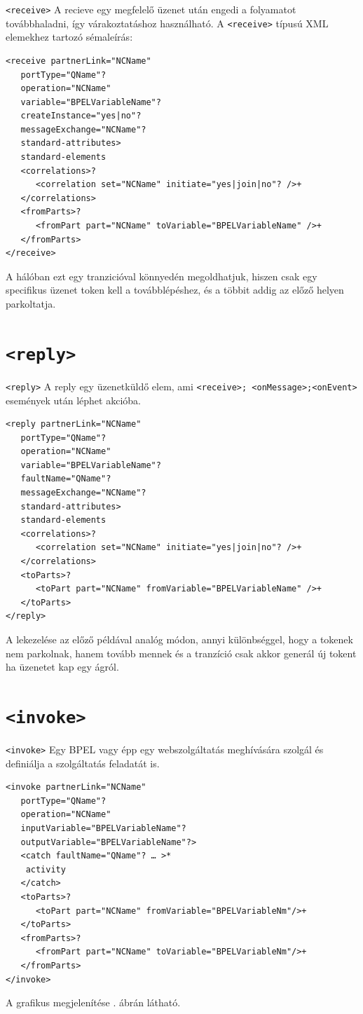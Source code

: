 \texttt{<receive>} A recieve egy megfelelő üzenet után engedi a folyamatot továbbhaladni, így várakoztatáshoz használható. A \texttt{<receive>} típusú XML elemekhez tartozó sémaleírás:\\
\begin{verbatim}
<receive partnerLink="NCName"
   portType="QName"?
   operation="NCName"
   variable="BPELVariableName"?
   createInstance="yes|no"?
   messageExchange="NCName"?
   standard-attributes>
   standard-elements
   <correlations>?
      <correlation set="NCName" initiate="yes|join|no"? />+
   </correlations>
   <fromParts>?
      <fromPart part="NCName" toVariable="BPELVariableName" />+
   </fromParts>
</receive>
\end{verbatim}
A hálóban ezt egy tranzicióval könnyedén megoldhatjuk, hiszen csak egy specifikus üzenet token kell a továbblépéshez, és a többit addig az előző helyen parkoltatja. 

\section{\texttt{<reply>}}

\texttt{<reply>} A reply egy üzenetküldő elem, ami \texttt{<receive>; <onMessage>;<onEvent>} események után léphet akcióba. 
\begin{verbatim}
<reply partnerLink="NCName"
   portType="QName"?
   operation="NCName"
   variable="BPELVariableName"?
   faultName="QName"?
   messageExchange="NCName"?
   standard-attributes>
   standard-elements
   <correlations>?
      <correlation set="NCName" initiate="yes|join|no"? />+
   </correlations>
   <toParts>?
      <toPart part="NCName" fromVariable="BPELVariableName" />+
   </toParts>
</reply>
\end{verbatim}
A lekezelése az előző példával analóg módon, annyi különbséggel, hogy a tokenek nem parkolnak, hanem tovább mennek és a tranzíció csak akkor generál új tokent ha üzenetet kap egy ágról.

\section{\texttt{<invoke>}}

\texttt{<invoke>} Egy BPEL vagy épp egy webszolgáltatás meghívására szolgál és definiálja a szolgáltatás feladatát is. 
\begin{verbatim}
<invoke partnerLink="NCName"
   portType="QName"?
   operation="NCName"
   inputVariable="BPELVariableName"?
   outputVariable="BPELVariableName"?>
   <catch faultName="QName"? … >*
  	activity
   </catch>
   <toParts>?
      <toPart part="NCName" fromVariable="BPELVariableNm"/>+
   </toParts>
   <fromParts>?
      <fromPart part="NCName" toVariable="BPELVariableNm"/>+
   </fromParts>
</invoke>

\end{verbatim}
A grafikus megjelenítése . ábrán látható.

